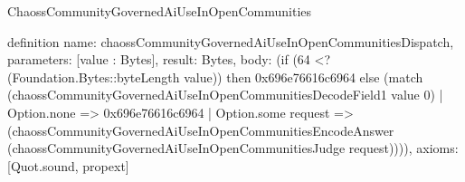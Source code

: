 \begin{lexlean}{ChaossCommunityGovernedAiUseInOpenCommunities}
\begin{semanticmodule}
definition{
  name: chaossCommunityGovernedAiUseInOpenCommunitiesDispatch,
  parameters: [value : Bytes],
  result: Bytes,
  body: (if (64 <? (Foundation.Bytes::byteLength value)) then 0x696e76616c6964 else (match (chaossCommunityGovernedAiUseInOpenCommunitiesDecodeField1 value 0)
    | Option.none => 0x696e76616c6964
    | Option.some request => (chaossCommunityGovernedAiUseInOpenCommunitiesEncodeAnswer (chaossCommunityGovernedAiUseInOpenCommunitiesJudge request)))),
  axioms: [Quot.sound, propext]
}
\end{semanticmodule}
\end{lexlean}
